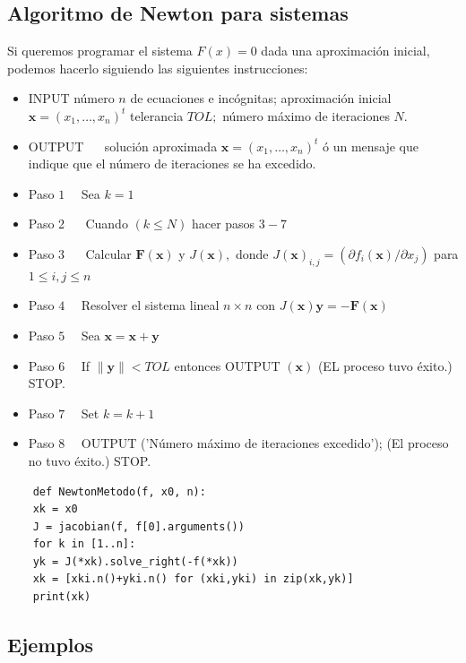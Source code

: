 \subsection{Algoritmo de Newton para sistemas}

Si queremos programar el sistema $F(x) = 0$ dada una aproximación inicial, podemos hacerlo siguiendo las siguientes instrucciones: \\

\begin{itemize}
\item INPUT número $n$ de ecuaciones e incógnitas; aproximación inicial $\mathbf{x}=\left(x_{1}, \ldots, x_{n}\right)^{t}$ telerancia $T O L ;$ número máximo de iteraciones $N$. 
\item OUTPUT $\quad$ solución aproximada $\mathbf{x}=\left(x_{1}, \ldots, x_{n}\right)^{t}$ ó un mensaje que indique que el número de iteraciones se ha excedido.
\item Paso $1 \quad$ Sea $k=1$
\item Paso 2 $\quad$ Cuando $(k \leq N)$ hacer pasos $3-7$
\item Paso 3 $\quad$ Calcular $\mathbf{F}(\mathbf{x})$ y $J(\mathbf{x}),$ donde $J(\mathbf{x})_{i, j}=\left(\partial f_{i}(\mathbf{x}) / \partial x_{j}\right)$ para $1 \leq i, j \leq n$
\item Paso $4 \quad$ Resolver el sistema lineal $n \times n$ con $J(\mathbf{x}) \mathbf{y}=-\mathbf{F}(\mathbf{x})$
\item Paso $5 \quad$ Sea $\mathbf{x}=\mathbf{x}+\mathbf{y}$
\item Paso $6 \quad$ If $\|\mathbf{y}\|<T O L$ entonces OUTPUT $(\mathbf{x})$ (EL proceso tuvo éxito.) STOP.
\item Paso $7 \quad$ Set $k=k+1$
\item Paso $8 \quad$ OUTPUT ('Número máximo de iteraciones excedido'); (El proceso no tuvo éxito.) STOP.
\end{itemize}


\begin{verbatim}
	def NewtonMetodo(f, x0, n):
	xk = x0
	J = jacobian(f, f[0].arguments())
	for k in [1..n]:
	yk = J(*xk).solve_right(-f(*xk))
	xk = [xki.n()+yki.n() for (xki,yki) in zip(xk,yk)]
	print(xk)
\end{verbatim}

\subsection{Ejemplos}

